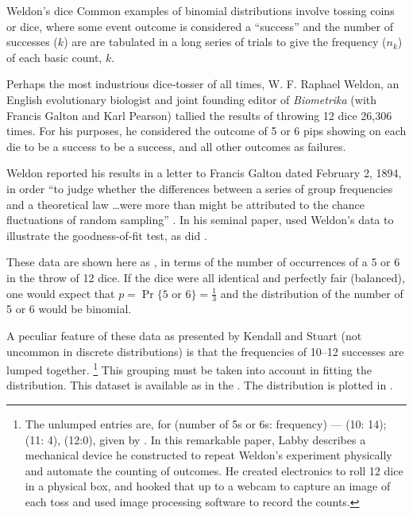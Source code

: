 \documentclass[11pt]{book}
\begin{document}
\begin{Example}[dice]{Weldon's dice}
Common examples of binomial distributions involve tossing coins
or dice, where some event outcome is considered a ``success''
and the number of successes ($k$) are are tabulated 
in a long series of trials to give the frequency ($n_k$) 
of each basic count, $k$.

Perhaps the most industrious dice-tosser of all times,
W. F. Raphael Weldon, an English evolutionary biologist
and joint founding editor of \emph{Biometrika} (with Francis Galton and Karl Pearson)
tallied the results of throwing 12 dice 26,306 times.
For his purposes, he considered the outcome of 5 or 6 pips showing on each die
to be a success to be a success, and all other outcomes as failures.

Weldon reported his results in a letter to Francis Galton dated
February 2, 1894, in order
``to judge whether the differences between a series of group frequencies
and a theoretical law \dots were more than might be attributed
to the chance fluctuations of random sampling''
\citep{KempKemp:91}.
In his seminal paper,
\citet{Pearson:00} used Weldon's data to illustrate the \chisq{} goodness-of-fit test, as did
\citet[Table 5.1, p. 121]{KendallStuart:63}.  

These data are
shown here as
,
in terms of the number of occurrences of a 5 or
6 in the throw of 12 dice.
If the dice were all identical and perfectly fair (balanced), one would
expect that $p = \Pr\{5 \textrm{ or } 6\} = \frac13$
and the distribution of the number of 5 or 6 would be binomial.

A peculiar feature of these data
as presented by Kendall and Stuart (not uncommon in discrete distributions)
is that the frequencies of 10--12 successes
are lumped together.%
\footnote{
The unlumped entries are, for (number of 5s or 6s: frequency) ---
(10: 14); (11: 4), (12:0),
given by \citet{Labby:2009}.
In this remarkable paper, Labby describes a mechanical device he constructed to 
repeat Weldon's experiment physically and automate the counting of outcomes.
He created electronics to roll 12 dice in a physical box, and hooked that
up to a webcam to capture an image of each toss and used image processing
software to record the counts.
}
This grouping must be taken into account in fitting
the distribution.  This dataset is available as  in the
.  The distribution is plotted in .




\end{Example}
\end{document}
